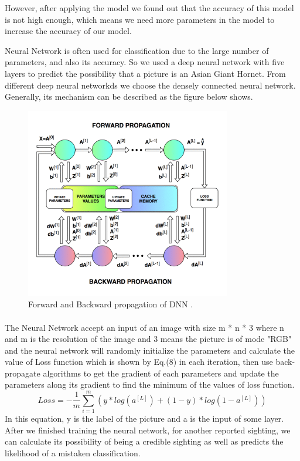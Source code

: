 \documentclass{mcmthesis}
\begin{document}
However, after applying the model we found out that the accuracy of this model is not high enough, which means we need more parameters in the model to increase the accuracy of our model. 

Neural Network is often used for classification due to the large number of parameters, and also its accuracy. So we used a deep neural network with five layers to predict the possibility that a picture is an Asian Giant Hornet. From different deep neural networkds we choose the densely connected neural network. Generally, its mechanism can be described as the figure below shows.
\begin{figure}[!htbp]
	\centering
 	\includegraphics[width = 0.8\textwidth]{DCNN.png} 
	\caption{Forward and Backward propagation of DNN \cite{DNN}.}
	\label{fig:DNN}
\end{figure}
\paragraph{ } The Neural Network accept an input of an image with size m * n * 3 where n and m is the resolution of the image and 3 means the picture is of mode "RGB" and the neural network will randomly initialize the parameters and calculate the value of Loss function which is shown by Eq.(8) in each iteration, then use back-propagate algorithms to get the gradient of each parameters and update the parameters along its gradient to find the minimum of the values of loss function.
\begin{equation}
    Loss = - \frac{1}{m} \sum_{i=1}^m (y*log(a^{[L]})+(1-y)*log(1-a^{[L]}))
\end{equation}
In this equation, y is the label of the picture and a is the input of some layer.
After we finished training the neural network, for another reported sighting, we can calculate its possibility of being a credible sighting as well as predicts the likelihood of a mistaken classification.
\end{document}
